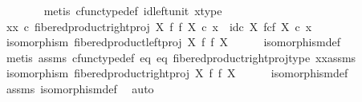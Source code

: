 \begin{isabellebody}
\ \ \ \ \ \ \isamarkupfalse%
\ {\isacharparenleft}{\kern0pt}metis\ cfunc{\isacharunderscore}{\kern0pt}type{\isacharunderscore}{\kern0pt}def\ id{\isacharunderscore}{\kern0pt}left{\isacharunderscore}{\kern0pt}unit\ x{\isacharunderscore}{\kern0pt}type{\isacharparenright}{\kern0pt}\isanewline
\ \ \ \ \isamarkupfalse%
\ \isamarkupfalse%
\ {\isachardoublequoteopen}{\isacharparenleft}{\kern0pt}xx\ {\isasymcirc}\isactrlsub c\ fibered{\isacharunderscore}{\kern0pt}product{\isacharunderscore}{\kern0pt}right{\isacharunderscore}{\kern0pt}proj\ X\ f\ f\ X{\isacharparenright}{\kern0pt}\ {\isasymcirc}\isactrlsub c\ x\ {\isacharequal}{\kern0pt}\ id\isactrlsub c\ {\isacharparenleft}{\kern0pt}X\ \isactrlbsub f\isactrlesub {\isasymtimes}\isactrlsub c\isactrlbsub f\isactrlesub \ X{\isacharparenright}{\kern0pt}\ {\isasymcirc}\isactrlsub c\ x{\isachardoublequoteclose}\isacommand{{\isachardot}{\kern0pt}}\isamarkupfalse%
\isanewline
\ \ \isamarkupfalse%
\isanewline
\isanewline
\ \ \isamarkupfalse%
\ {\isachardoublequoteopen}isomorphism\ {\isacharparenleft}{\kern0pt}fibered{\isacharunderscore}{\kern0pt}product{\isacharunderscore}{\kern0pt}left{\isacharunderscore}{\kern0pt}proj\ X\ f\ f\ X{\isacharparenright}{\kern0pt}{\isachardoublequoteclose}\isanewline
\ \ \ \ \isamarkupfalse%
\ isomorphism{\isacharunderscore}{\kern0pt}def\isanewline
\ \ \ \ \isamarkupfalse%
\ {\isacharparenleft}{\kern0pt}metis\ assms\ cfunc{\isacharunderscore}{\kern0pt}type{\isacharunderscore}{\kern0pt}def\ eq{}\ eq{}\ fibered{\isacharunderscore}{\kern0pt}product{\isacharunderscore}{\kern0pt}right{\isacharunderscore}{\kern0pt}proj{\isacharunderscore}{\kern0pt}type\ xx{\isacharunderscore}{\kern0pt}assms{\isacharparenleft}{\kern0pt}{}{\isacharparenright}{\kern0pt}{\isacharparenright}{\kern0pt}\isanewline
\isanewline
\ \ \isamarkupfalse%
\ \isamarkupfalse%
\ {\isachardoublequoteopen}isomorphism\ {\isacharparenleft}{\kern0pt}fibered{\isacharunderscore}{\kern0pt}product{\isacharunderscore}{\kern0pt}right{\isacharunderscore}{\kern0pt}proj\ X\ f\ f\ X{\isacharparenright}{\kern0pt}{\isachardoublequoteclose}\isanewline
\ \ \ \ \isamarkupfalse%
\ isomorphism{\isacharunderscore}{\kern0pt}def\isanewline
\ \ \ \ \isamarkupfalse%
\ assms{\isacharparenleft}{\kern0pt}{}{\isacharparenright}{\kern0pt}\ isomorphism{\isacharunderscore}{\kern0pt}def\ \isamarkupfalse%
\ auto\isanewline

\end{isabellebody}
